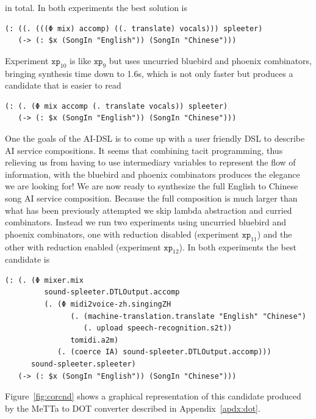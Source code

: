 \documentclass[]{report}
\begin{document}
in total.  In both experiments the best solution is
\begin{verbatim}
(: ((. (((Φ mix) accomp) ((. translate) vocals))) spleeter)
   (-> (: $x (SongIn "English")) (SongIn "Chinese")))
\end{verbatim}
Experiment $\texttt{xp}_{10}$ is like $\texttt{xp}_9$ but uses
uncurried bluebird and phoenix combinators, bringing synthesis time
down to 1.6s, which is not only faster but produces a candidate that
is easier to read
\begin{verbatim}
(: (. (Φ mix accomp (. translate vocals)) spleeter)
   (-> (: $x (SongIn "English")) (SongIn "Chinese")))
\end{verbatim}
One the goals of the AI-DSL is to come up with a user friendly DSL to
describe AI service compositions.  It seems that combining tacit
programming, thus relieving us from having to use intermediary
variables to represent the flow of information, with the bluebird and
phoenix combinators produces the elegance we are looking for!  We are
now ready to synthesize the full English to Chinese song AI service
composition.  Because the full composition is much larger than what
has been previously attempted we skip lambda abstraction and curried
combinators.  Instead we run two experiments using uncurried bluebird
and phoenix combinators, one with reduction disabled (experiment
$\texttt{xp}_{11}$) and the other with reduction enabled (experiment
$\texttt{xp}_{12}$).  In both experiments the best candidate is
\begin{small}
\begin{verbatim}
(: (. (Φ mixer.mix
         sound-spleeter.DTLOutput.accomp
         (. (Φ midi2voice-zh.singingZH
               (. (machine-translation.translate "English" "Chinese")
                  (. upload speech-recognition.s2t))
               tomidi.a2m)
            (. (coerce IA) sound-spleeter.DTLOutput.accomp)))
      sound-spleeter.spleeter)
   (-> (: $x (SongIn "English")) (SongIn "Chinese")))
\end{verbatim}
\end{small}
Figure~\ref{fig:corcnd} shows a graphical representation of this candidate
produced by the MeTTa to DOT converter described in
Appendix~\ref{apdx:dot}.
\end{document}
